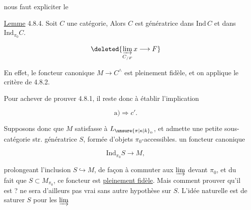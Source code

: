  nous faut expliciter le

\uline{Lemme} 4.8.4. Soit $C$ une catégorie,    Alors $C$ est  génératrice dans $\mathrm{Ind}\, C$ et dans $\mathrm{Ind}_{\pi_0}C$.


\[ \deleted{\varinjlim_{C_{/F}}x\longrightarrow F} \]





En effet, le foncteur canonique $M\longrightarrow C^{\wedge}$ est pleinement fidèle, et on applique le critère  de 4.8.2.

Pour achever de prouver 4.8.1, il reste donc à établir l'implication

\[ \mathrm a)\Longrightarrow c'. \]


Supposons donc que $M$ satisfasse à $L_{\unsure{\pi|\kappa|k}_0}$, et admette une petite sous-catégorie str. génératrice $S$, formée d'objets $\pi_0$-accessibles.    un foncteur canonique

\[ \mathrm{Ind}_{\pi_0}S\longrightarrow M, \]

prolongeant l'inclusion  $S\hookrightarrow M$, de façon à commuter aux $\varinjlim$  devant $\pi_0$, et du fait que $S\subset M_{\pi_0}$, ce foncteur est \uline{pleinement fidèle}. Mais comment prouver qu'il est  ?  ne sera d'ailleurs pas vrai  sans autre hypothèse sur $S$.  L'idée naturelle est de saturer $S$ pour les $\varinjlim$

